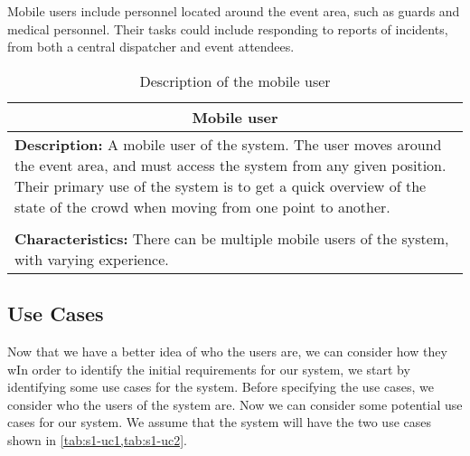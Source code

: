 Mobile users include personnel located around the event area, such as guards and medical personnel. Their tasks could include responding to reports of incidents, from both a central dispatcher and event attendees.

\begin{table}[h!]
    \centering
    \begin{tabularx}{/4}{X}
        \toprule
        \multicolumn{1}{c}{\textbf{Mobile user}} \\ 
        \midrule
        \textbf{Description:} A mobile user of the system. The user moves around the event area, and must access the system from any given position. Their primary use of the system is to get a quick overview of the state of the crowd when moving from one point to another. \\
        \\
        \textbf{Characteristics:} There can be multiple mobile users of the system, with varying experience. \\
        \bottomrule
    \end{tabularx}
    \caption{Description of the mobile user}
    \label{tab:mob_user}
\end{table}


\subsection{Use Cases}
Now that we have a better idea of who the users are, we can consider how they wIn order to identify the initial requirements for our system, we start by identifying some use cases for the system. Before specifying the use cases, we consider who the users of the system are. 
Now we can consider some potential use cases for our system. We assume that the system will have the two use cases shown in \cref{tab:s1-uc1,tab:s1-uc2}.

